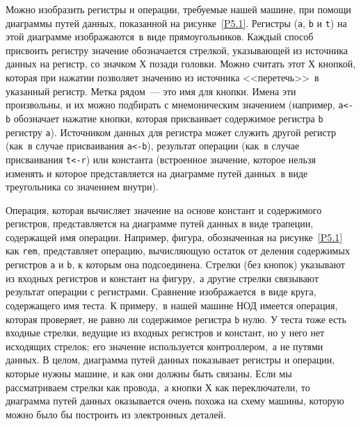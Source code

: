 Можно изобразить регистры и операции, требуемые нашей
машине, при помощи 
диаграммы путей данных, показанной на 
рисунке~\ref{P5.1}. Регистры ({\tt a}, {\tt b} и
{\tt t}) на этой диаграмме изображаются~в виде
прямоугольников.  Каждый способ присвоить регистру значение
обозначается стрелкой, указывающей из источника данных на регистр, со
значком Х позади головки. Можно считать этот Х кнопкой, которая при
нажатии позволяет значению из источника <<перетечь>>~в указанный
регистр.  Метка рядом~--- это имя для кнопки.
Имена эти произвольны, и их можно подбирать с мнемоническим
значением (например, {\tt a<-b} обозначает нажатие кнопки,
которая присваивает содержимое регистра {\tt b} регистру
{\tt a}). Источником данных для регистра может служить другой
регистр (как~в случае присваивания {\tt a<-b}), результат
операции (как~в случае присваивания {\tt t<-r}) или константа
(встроенное значение, которое нельзя изменять и которое представляется
на диаграмме путей данных~в виде треугольника со значением
внутри).

Операция, которая вычисляет значение на основе констант и
содержимого регистров, представляется на диаграмме путей данных в
виде трапеции, содержащей имя операции.  Например, фигура,
обозначенная на рисунке~\ref{P5.1} как {\tt rem},
представляет операцию, вычисляющую остаток от деления содержимых
регистров {\tt a} и {\tt b}, к которым она
подсоединена.  Стрелки (без кнопок) указывают из входных регистров и
констант на фигуру,~а другие стрелки связывают результат операции с
регистрами.  Сравнение изображается~в виде круга, содержащего имя
теста.  К примеру,~в нашей машине НОД имеется операция, которая
проверяет, не равно ли содержимое регистра {\tt b} нулю.  У
теста тоже есть входные стрелки, ведущие из входных регистров и
констант, но у него нет исходящих стрелок; его значение используется
контроллером,~а не путями данных.  В целом, диаграмма путей данных
показывает регистры и операции, которые нужны машине, и как они должны
быть связаны.  Если мы рассматриваем стрелки как провода,~а кнопки Х
как переключатели, то диаграмма путей данных оказывается очень
похожа на схему машины, которую можно было бы построить из
электронных деталей.

